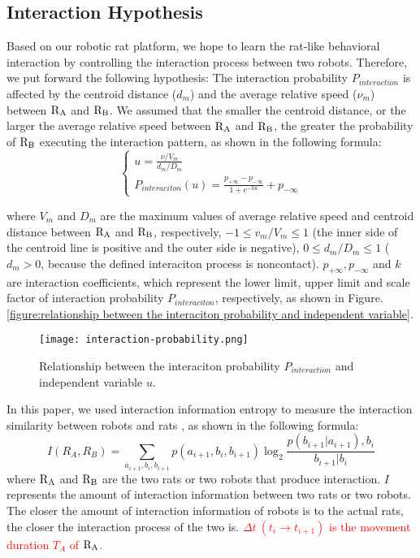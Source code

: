 \subsection{Interaction Hypothesis}
Based on our robotic rat platform, we hope to learn the rat-like behavioral
interaction by controlling the interaction process between two robots. Therefore,
we put forward the following hypothesis: The interaction probability
$P_{interaction}$ is affected by the centroid distance ($d_m$) and the average
relative speed ($\nu_m$) between $\rm R_A$ and $\rm R_B$. We assumed that the
smaller the centroid distance, or the larger the average relative speed between
$\rm R_A$ and $\rm R_B$, the greater the probability of $\rm R_B$ executing the
interaction pattern, as shown in the following formula:
\begin{equation} \label{eq:probability of interaciton}
    \displaystyle\begin{cases}
        u=\displaystyle\frac{\nu/V_m}{d_m/D_m} \\
        P_{interaciton}(u)=\displaystyle\frac{p_{+\infty}-p_{-\infty}}{1+e^{-ku}}
        +p_{-\infty}
    \end{cases}
\end{equation}

where $V_m$ and $D_m$ are the maximum values of average relative speed and
centroid distance between $\rm R_A$ and $\rm R_B$, respectively, $-1\leq
v_m/V_m\leq 1$ (the inner side of the centroid line is positive and the outer
side is negative), $0\leq d_m/D_m\leq 1$ ($d_m>0$, because the defined
interaciton process is noncontact). $p_{+\infty},p_{-\infty}$ and $k$ are
interaction coefficients, which represent the lower limit, upper limit and scale
factor of interaction probability $P_{interaciton}$, respectively, as shown in
Figure. \ref{figure:relationship between the interaciton probability and
independent variable}.
\begin{figure}[h]
    \centering
    \texttt{[image: interaction-probability.png]}
    \caption{Relationship between the interaciton probability $P_{interaction}$
    and independent variable $u$.}
    \label{figure:relationship between the interaciton probability and
    independent variable}
\end{figure}

In this paper, we used interaction information entropy to measure the
interaction similarity between robots and rats \cite{lellis-feedback-control},
as shown in the following formula:
\begin{equation} \label{eq:interaction similarity}
    I(R_A,R_B)=\sum_{a_{i+1},b_i,b_{i+1}}p(a_{i+1},b_i,b_{i+1})\log_{2}
    \frac{p(b_{i+1}|a_{i+1}),b_{i}}{b_{i+1}|b_i}
\end{equation}
where $\rm R_A$ and $\rm R_B$ are the two rats or two robots that produce
interaction. $I$ represents the amount of interaction information between two
rats or two robots. The closer the amount of interaction information of robots
is to the actual rats, the closer the interaction process of the two is.
\textcolor{red}{$\Delta t~(t_i\rightarrow t_{i+1})$ is the movement duration
$T_A$ of $\rm R_A$.}

